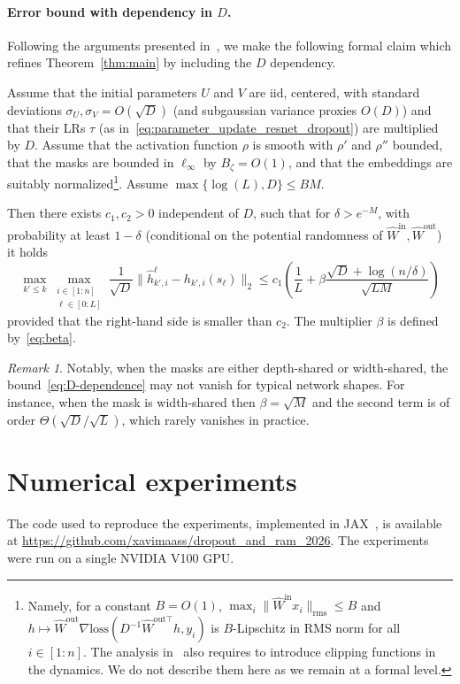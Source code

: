 \documentclass[a4paper,11pt]{article}
\newcommand{\1}{\mathbbm{1}}
\newcommand{\hWin}[1]{\hat{W}^{\mathrm{in}#1}}
\newcommand{\hWout}[1]{\hat{W}^{\mathrm{out}#1}}
\theoremstyle{definition}
\theoremstyle{remark}
\newtheorem{rem}{Remark}
\begin{document}
\paragraph{Error bound with dependency in $D$.} Following the arguments presented in~\cite[Theorem 3]{chizat2025hidden},  we make the following formal claim which refines Theorem~\ref{thm:main} by including the $D$ dependency.

Assume that the initial parameters  $U$ and $V$ are iid, centered, with standard deviations $\sigma_U, \sigma_V = O(\sqrt{D})$ (and subgaussian variance proxies $O(D)$) and that their LRs $\tau$ (as in~\eqref{eq:parameter_update_resnet_dropout}) are multiplied by $D$. Assume that the activation function $\rho$ is smooth with $\rho'$ and $\rho''$ bounded, that the masks are bounded in $\ell_\infty$ by $B_\zeta = O(1)$, and that the embeddings are suitably normalized\footnote{Namely, for a constant $B=O(1)$, $\max_i\|\hWin{}x_i\|_{\mathrm{rms}} \leq B$ and $h\mapsto \hWout{}\nabla\mathrm{loss}(D^{-1}\hWout{\top}h, y_i)$ is $B$-Lipschitz in RMS norm for all $i\in[1:n]$. The analysis in~\cite{chizat2025hidden} also requires to introduce clipping functions in the dynamics. We do not describe them here as we remain at a formal level.}. Assume $\max\{\log(L), D\}\leq BM$. 

Then there exists $c_1, c_2>0$ independent of $D$, such that for $\delta>e^{-M}$, with probability at least $1-\delta$ (conditional on the potential randomness of $\hWin{}, \hWout{}$) it holds
\begin{equation}\label{eq:D-dependence}
  \max_{k'\leq k} \max_{\substack{i \in [1:n] \\ \ell \in [0:L]}} \frac{1}{\sqrt{D}}\| \hat{h}_{k',i}^{\ell} - h_{k',i}(s_\ell) \|_{2}
  \leq c_1 \left(\frac{1}{L}
    + \beta \frac{\sqrt{D} + \log(n/\delta)}{\sqrt{LM}}
  \right)
\end{equation}
provided that the right-hand side is smaller than $c_2$. 
The multiplier $\beta$ is defined by~\eqref{eq:beta}.
\begin{rem}
    Notably, when the masks are either depth-shared or width-shared, the bound~\eqref{eq:D-dependence} may not vanish for typical network shapes. For instance, when the mask is width-shared then $\beta=\sqrt{M}$ and the second term is of order $\Theta(\sqrt{D}/\sqrt{L})$, which rarely vanishes in practice.
\end{rem}

\section{Numerical experiments}\label{sec:numerics}
The code used to reproduce the experiments, implemented in JAX~\cite{jax2018github}, is available at
\url{https://github.com/xavimaass/dropout_and_ram_2026}.
The experiments were run on a single NVIDIA V100 GPU.
\end{document}
